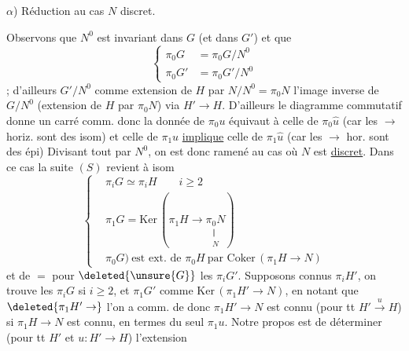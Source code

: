 $\alpha$) Réduction au cas $N$ discret.

Observons que $N^0$ est invariant dans $G$ (et dans $G'$) et que
\[
\left\{\begin{aligned}
\pi_0 G&=\pi_0 G/N^0\\
\pi_0 G'&=\pi_0 G'/N^0
\end{aligned}\right.
\]
; d'ailleurs $G'/N^0$ comme extension de $H$ par $N/N^0=\pi_0N$ l'image inverse de $G/N^0$ (extension de $H$ par $\pi_0N$) via $H'\to H$. D'ailleurs le diagramme commutatif
donne un carré comm.
donc la donnée de $\pi_0u$ équivaut à celle de $\pi_0\widehat u$ (car les $\to$ horiz. sont des isom) et celle de $\pi_1u$ \uline{implique} celle de $\pi_1\widehat u$ (car les $\to$ hor. sont des épi)  Divisant tout par $N^0$, on est donc ramené au cas où $N$ est \uline{discret}. Dans ce cas la suite $(S)$ revient à  isom
\[
\left\{\begin{aligned}
&\pi_iG\simeq\pi_iH\qquad i\geq2\\
&\pi_1G=\mathrm{Ker}\,(\pi_1 H\to\underset{\substack{\Vert\\N}}{\pi_0N})\\
&\pi_0G)\ \text{est ext. de }\pi_0H\ \text{par }\mathrm{Coker}\,(\pi_1 H\to N)
\end{aligned}\right.
\]
et de $=$ pour $\deleted{\unsure{G}}$ les $\pi_iG'$.  Supposons connus  $\pi_i H'$, on trouve les $\pi_i G$ si $i\geq2$, et $\pi_1G'$ comme $\mathrm{Ker}\,(\pi_1H'\to N)$, en notant que $\deleted{\pi_1H'\to}$ l'on a comm. de
donc $\pi_1H'\to N$ est connu (pour tt $H'\xrightarrow{u}H$) si $\pi_1H\to N$ est connu, en termes du seul $\pi_1u$. Notre propos est    de déterminer (pour tt $H'$ et $u:H'\to H$) l'extension
